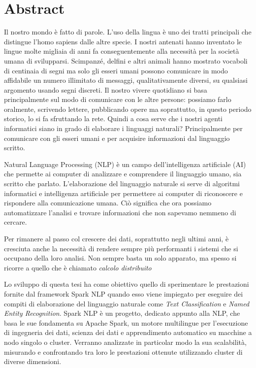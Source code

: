 \chapter{Abstract} \label{abstract}
Il nostro mondo è fatto di parole. L’uso della lingua è uno dei tratti principali che distingue l’homo sapiens dalle altre specie. I nostri antenati hanno inventato le lingue molte migliaia di anni fa conseguentemente alla necessità per la società umana di svilupparsi. Scimpanzé, delfini e altri animali hanno mostrato vocaboli di centinaia di segni ma solo gli esseri umani possono comunicare in modo affidabile un numero illimitato di messaggi, qualitativamente diversi, su qualsiasi argomento usando segni discreti. 
Il nostro vivere quotidiano si basa principalmente sul modo di comunicare con le altre persone: possiamo farlo oralmente, scrivendo lettere, pubblicando opere ma soprattutto, in questo periodo storico, lo si fa sfruttando la rete. Quindi a cosa serve che i nostri agenti informatici siano in grado di elaborare i linguaggi naturali? Principalmente per comunicare con gli esseri umani e per acquisire informazioni dal linguaggio scritto.

Natural Language Processing (NLP) è un campo dell'intelligenza artificiale (AI) che permette ai computer di analizzare e comprendere il linguaggio umano, sia scritto che parlato. L'elaborazione del linguaggio naturale si serve di algoritmi informatici e intelligenza artificiale per permettere ai computer di riconoscere e rispondere alla comunicazione umana. Ciò significa che ora possiamo automatizzare l'analisi e trovare informazioni che non sapevamo nemmeno di cercare.

Per rimanere al passo col crescere dei dati, soprattutto negli ultimi anni, è cresciuta anche la necessità di rendere sempre più performanti i sistemi che si occupano della loro analisi. Non sempre basta un solo apparato, ma spesso si ricorre a quello che è chiamato \textit{calcolo distribuito}

Lo sviluppo di questa tesi ha come obiettivo quello di sperimentare le prestazioni fornite dal framework Spark NLP quando esso viene impiegato per eseguire dei compiti di elaborazione del linguaggio naturale come \textit{Text Classification} e \textit{Named Entity Recognition}. Spark NLP è un progetto, dedicato appunto alla NLP, che basa le sue fondamenta su Apache Spark, un motore multilingue per l'esecuzione di ingegneria dei dati, scienza dei dati e apprendimento automatico su macchine a nodo singolo o cluster. Verranno analizzate in particolar modo la sua scalabilità, misurando e confrontando tra loro le prestazioni ottenute utilizzando cluster di diverse dimensioni.

